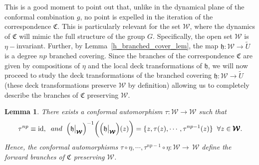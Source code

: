 \documentclass[11pt,a4paper, oneside]{amsart}
\newtheorem{lemma}[thm]{Lemma}
\theoremstyle{definition}
\theoremstyle{remark}
\numberwithin{equation}{section}
\def\cW{\mathcal {W}}
\renewcommand{\tilde}{\widetilde}
\begin{document}
This is a good moment to point out that, unlike in the dynamical plane of the conformal combination $g$, no point is expelled in the iteration of the correspondence $\mathfrak{C}$. This is particularly relevant for the set $\pmb{\cW}$, where the dynamics of $\mathfrak{C}$ will mimic the full structure of the group $G$. 
Specifically, the open set $\pmb{\cW}$ is $\eta-$invariant.
Further, by Lemma~\ref{h_branched_cover_lem}, the map $\mathfrak{h} \colon \pmb{\cW}\to\tilde U$ is a degree $np$ branched covering. Since the branches of the correspondence $\mathfrak{C}$ are given by compositions of $\eta$ and the local deck transformations of $\mathfrak{h}$, we will now proceed to study the deck transformations of the branched covering $\mathfrak{h} \colon\pmb{\cW}\to\tilde U$ (these deck transformations preserve $\pmb{\cW}$ by definition) allowing us to completely describe the branches of $\mathfrak{C}$ preserving $\pmb{\cW}$.

\begin{lemma}\label{deck_tau_lem}
    There exists a conformal automorphism $\tau\colon\pmb{\cW}\to\pmb{\cW}$ such that
    $$
    \tau^{np}\equiv \text{id}, \hspace{2mm} and \hspace{2mm}\Big(\mathfrak{h}\big|_{\pmb{\cW}}\Big)^{-1}\bigg(\Big(\mathfrak{h}\big|_{\pmb{\cW}}\Big)(z)\bigg) = \{z, \tau(z), \cdots, \tau^{np-1}(z)\} \hspace{2mm}\forall z\in \pmb{\cW}. 
    $$
Hence, the conformal automorphisms $\tau\circ\eta,\cdots,\tau^{np-1}\circ\eta \colon \pmb{\cW}\to\,\pmb{\cW}$ define the forward branches of $\mathfrak{C}$ preserving $\pmb{\cW}$.
\end{lemma}
\end{document}
